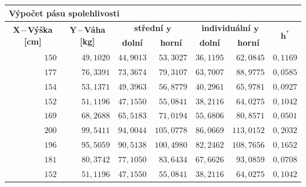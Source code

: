 \documentclass[a4paper, 11pt]{article}
\begin{document}
	\begin{table}[H]
		\centering
		\begin{tabular}{|r|r|r|r|r|r|r|}
			\multicolumn{7}{l}{\textbf{Výpočet pásu spolehlivosti}} \\[.5em]
			\hline

			\multicolumn{1}{|c|}{\multirow{2}{*}{\textbf{$
			\boldsymbol{X} $\,--\,Výška [cm]}}}
			& \multicolumn{1}{c|}{\multirow{2}{*}{\textbf{$
			\boldsymbol{Y} $\,--\,Váha [kg]}}}
			& \multicolumn{2}{c|}{\textbf{střední $ \boldsymbol{y} $}}
			& \multicolumn{2}{c|}{\textbf{individuální $ \boldsymbol{y} $}}
			& \multicolumn{1}{c|}{\multirow{2}{*}{$ \boldsymbol{h^*} $}}
			\\ \cline{3-6}

			&
			& \multicolumn{1}{c}{\textbf{dolní}}
			& \multicolumn{1}{c|}{\textbf{horní}}
			& \multicolumn{1}{c|}{\textbf{dolní}}
			& \multicolumn{1}{c|}{\textbf{horní}}
			& \multicolumn{1}{c|}{} \\ \hline

			$ 150 $ & $ 49,1020 $ & $ 44,9013 $ & $ 53,3027 $ & $ 36,1195 $
			& $ 62,0845 $ & $ 0,1169 $ \\ \hline

			$ 177 $ & $ 76,3391 $ & $ 73,3674 $ & $ 79,3107 $ & $ 63,7007 $
			& $ 88,9775 $ & $ 0,0585 $ \\ \hline

			$ 154 $ & $ 53,1371 $ & $ 49,3963 $ & $ 56,8779 $ & $ 40,2961 $
			& $ 65,9781 $ & $ 0,0927 $ \\ \hline

			$ 152 $ & $ 51,1196 $ & $ 47,1550 $ & $ 55,0841 $ & $ 38,2116 $
			& $ 64,0275 $ & $ 0,1042 $ \\ \hline

			$ 169 $ & $ 68,2688 $ & $ 65,5183 $ & $ 71,0194 $ & $ 55,6806 $
			& $ 80,8571 $ & $ 0,0501 $ \\ \hline

			$ 200 $ & $ 99,5411 $ & $ 94,0044 $ & $ 105,0778 $ & $ 86,0669 $
			& $ 113,0152 $ & $ 0,2032 $ \\ \hline

			$ 196 $ & $ 95,5059 $ & $ 90,5138 $ & $ 100,4980 $ & $ 82,2462 $
			& $ 108,7656 $ & $ 0,1652 $ \\ \hline

			$ 181 $ & $ 80,3742 $ & $ 77,1050 $ & $ 83,6434 $ & $ 67,6626 $
			& $ 93,0859 $ & $ 0,0708 $ \\ \hline

			$ 152 $ & $ 51,1196 $ & $ 47,1550 $ & $ 55,0841 $ & $ 38,2116 $
			& $ 64,0275 $ & $ 0,1042 $ \\ \hline


\end{tabular}
\end{table}
\end{document}
